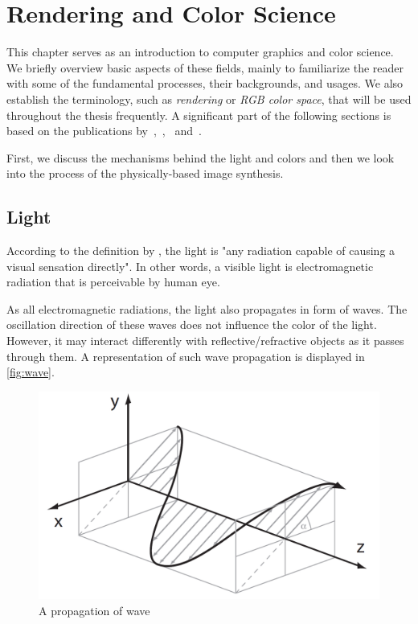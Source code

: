 \chapter{Rendering and Color Science}
\label{chap:render}

This chapter serves as an introduction to computer graphics and color science. We briefly overview basic aspects of these fields, mainly to familiarize the reader with some of the fundamental processes, their backgrounds, and usages. We also establish the terminology, such as \emph{rendering} or \emph{RGB color space}, that will be used throughout the thesis frequently. A significant part of the following sections is based on the publications by~\citet{wyszecki1982color},~\citet{colorScienceSlides},~\citet{nimier2019mitsuba} and~\citet{pharr2016physically}.

First, we discuss the mechanisms behind the light and colors and then we look into the process of the physically-based image synthesis.

\section{Light}

According to the definition by \citet{barbrow1964international}, the light is "any radiation capable of causing a visual sensation directly". In other words, a visible light is electromagnetic radiation that is perceivable by human eye. 

As all electromagnetic radiations, the light also propagates in form of waves. The oscillation direction of these waves does not influence the color of the light. However, it may interact differently with reflective/refractive objects as it passes through them. A representation of such wave propagation is displayed in \autoref{fig:wave}.

\begin{figure}[h]
	\centering
	\includegraphics[width=0.7\linewidth]{img/wave.png}
	\caption{A propagation of wave~\cite{colorScienceSlides}}
	\label{fig:wave}
\end{figure}


